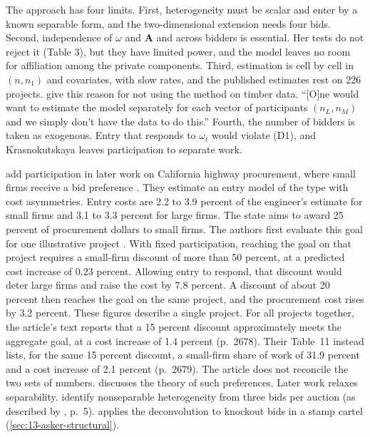 The approach has four limits. First, heterogeneity must be scalar and enter by a known separable
form, and the two-dimensional extension needs four bids. Second, independence of $\omega$ and $\bm A$
and across bidders is essential. Her tests do not reject it (Table 3), but they have limited power,
and the model leaves no room for affiliation among the private components. Third, estimation is cell
by cell in $(n,n_1)$ and covariates, with slow rates, and the published estimates rest on 226 projects.
\citet[footnote 22]{AtheyLevinSeira2011} give this reason for not using the method on timber data.
``[O]ne would want to estimate the model separately for each vector of participants $(n_L,n_M)$ and we
simply don't have the data to do this.'' Fourth, the number of bidders is taken as exogenous. Entry
that responds to $\omega_t$ would violate (D1), and Krasnokutskaya leaves participation to separate
work.

\citet{KrasnokutskayaSeim2011} add participation in later work on California highway procurement,
where small firms receive a bid preference \citep[p.~123]{HortacsuPerrigne2021}. They estimate an
entry model of the \citet{LevinSmith1994} type with cost asymmetries. Entry costs are 2.2 to 3.9
percent of the engineer's estimate for small firms and 3.1 to 3.3 percent for large firms. The state
aims to award 25 percent of procurement dollars to small firms. The authors first evaluate this goal for
one illustrative project \citep[pp.~2655--2656, Figure~1]{KrasnokutskayaSeim2011}. With fixed
participation, reaching the goal on that project requires a small-firm discount of more than 50 percent,
at a predicted cost increase of 0.23 percent. Allowing entry to respond, that discount would deter large
firms and raise the cost by 7.8 percent. A discount of about 20 percent then reaches the goal on the same
project, and the procurement cost rises by 3.2 percent. These figures describe a single project. For all
projects together, the article's text reports that a 15 percent discount approximately meets the aggregate goal, at a
cost increase of 1.4 percent (p.~2678). Their Table~11 instead lists, for the same 15 percent discount, a
small-firm share of work of 31.9 percent and a cost increase of 2.1 percent (p.~2679). The article does
not reconcile the two sets of numbers.  discusses the theory of such preferences. Later work relaxes separability.
\citet{HuMcAdamsShum2013} identify nonseparable heterogeneity from three bids per auction (as described
by \citealp{Roberts2013}, p.~5). \citet{Asker2010} applies the deconvolution to knockout bids in a
stamp cartel (\cref{sec:13-asker-structural}).

